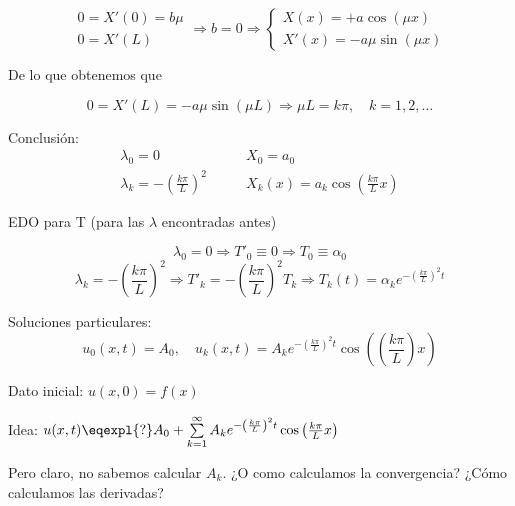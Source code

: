\begin{example}
\begin{itemize}
			 	\[
			 		\begin{array}{l}
			 		0 = X'(0) = b \mu \\
			 		0 = X'(L)
			 		\end{array} \Rightarrow b = 0 \Rightarrow \left\{ \begin{array}{l}
			 			X(x) = + a \cos (\mu x ) \\
			 			X'(x) = -a \mu \sin (\mu x)
			 		\end{array} \right.
			 	\]

			 	De lo que obtenemos que

			 	\[0 = X'(L) = -a \mu \sin(\mu L) \Rightarrow \mu L = k \pi , \quad k = 1,2,…\]



		\end{itemize}

		Conclusión:
				\begin{align*}
					\lambda_0 = 0\quad & \quad X_0 = a_0 \\
					\lambda_k = - \left(\frac{k\pi}{L}\right)^2\quad & \quad X_k(x) = a_k \cos \left(\frac{k \pi}{L}x\right)
				\end{align*}

			 	EDO para T (para las $\lambda$ encontradas antes)

			 	\[\lambda_0 = 0 \Rightarrow T'_0 \equiv 0 \Rightarrow T_0 \equiv \alpha_0\]
			 	\[\lambda_k = - \left(\frac{k\pi}{L}\right)^2 \Rightarrow T'_k = -\left(\frac{k\pi}{L}\right)^2 T_k \Rightarrow T_k (t) = \alpha_k e^{-\left(\frac{k\pi}{L}\right)^2 t} \]

			 	Soluciones particulares:
			 	\[u_0(x,t) = A_0, \quad u_k (x,t) = A_k e^{-\left(\frac{k \pi}{L} \right)^2 t} \cos \left( \left( \frac{k \pi}{L}\right) x \right) \]

			 	Dato inicial: $u(x,0) = f(x)$

			 	Idea: $u(x,t) \eqexpl{?} A_0 + \sum\limits_{k=1}^{\infty} A_k e^{- \left( \frac{k \pi}{L} \right)^2 t}  \cos \left( \frac{k \pi}{L} x \right)$

			 	Pero claro, no sabemos calcular $A_k$. ¿O como calculamos la convergencia? ¿Cómo calculamos las derivadas?


		\end{example}

